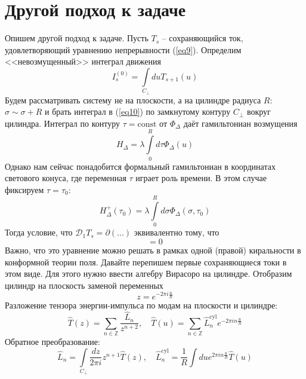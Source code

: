 \documentclass[12pt]{article}
\theoremstyle{definition}
\begin{document}
\section{Другой подход к задаче}
Опишем другой подход к задаче. Пусть $T_s$ -- сохраняющийся ток, удовлетворяющий уравнению непрерывности (\ref{eq9}). Определим <<невозмущенный>> интеграл движения
\begin{equation}\label{eq10}
    I_s^{(0)}=\int\limits_{C_\perp}duT_{s+1}(u)
\end{equation}
Будем рассматривать систему не на плоскости, а на цилиндре радиуса $R$: $\sigma\sim \sigma + R$ и брать интеграл в (\ref{eq10}) по замкнутому контуру $C_\perp$ вокруг цилиндра. Интеграл по контуру $\tau = \text{const}$ от $\Phi_\Delta$ даёт гамильтониан возмущения
\begin{equation}
    H_\Delta=\lambda\int\limits_0^Rd\tau\Phi_\Delta(u)
\end{equation}
Однако нам сейчас понадобится формальный гамильтониан в координатах светового конуса, где переменная $\tau$ играет роль времени. В этом случае фиксируем $\tau=\tau_0$:
\begin{equation}
    H^+_\Delta(\tau_0)=\lambda\int\limits_0^Rd\sigma\Phi_\Delta(\sigma,\tau_0)
\end{equation}
Тогда условие, что $\mathcal{D}_1T_s = \partial(...)$ эквивалентно тому, что
\begin{equation}
    [I^{(0)}_s,H_\Delta^+]=0
\end{equation}
Важно, что это уравнение можно решать в рамках одной (правой) киральности в конформной теории поля. Давайте перепишем первые сохраняющиеся токи в этом виде. Для этого нужно ввести алгебру Вирасоро на цилиндре. Отобразим цилиндр на плоскость заменой переменных
\begin{equation}
    z=e^{-2\pi i\frac{u}{R}}
\end{equation}
Разложение тензора энергии-импульса по модам на плоскости и цилиндре:
\begin{equation}
    \widehat{T}(z)=\sum\limits_{n\in\mathbb{Z}}\frac{\widehat{L}_n}{z^{n+2}},\quad \widehat{T}(u)=\sum\limits_{n\in\mathbb{Z}}\widehat{L}^{\text{cyl}}_{n}e^{-2\pi in\frac{u}{R}}
\end{equation}
Обратное преобразование:
\begin{equation}
    \widehat{L}_n=\int\limits_{C_\perp}\frac{dz}{2\pi i}z^{n+1}\widehat{T}(z),\quad \widehat{L}^{\text{cyl}}_n=\frac{1}{R}\int due^{2\pi in\frac{u}{R}}\widehat{T}(u)
\end{equation}
\end{document}
